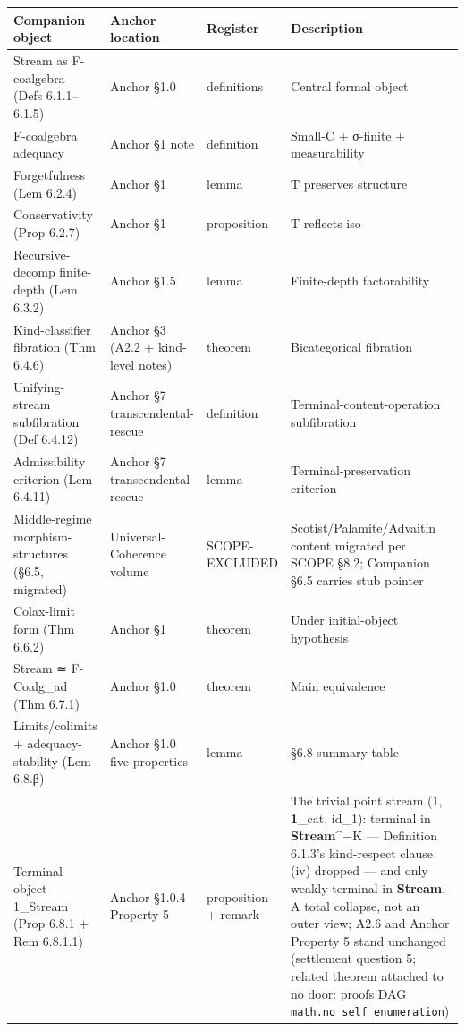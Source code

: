 \documentclass[11pt, openany]{book}
\begin{document}
\begingroup\setlength{\tabcolsep}{3pt}\renewcommand{\arraystretch}{1.15}\footnotesize
\begin{longtable}{p{0.52in} p{0.52in} p{0.52in} p{2.73in}}
\toprule
Companion object & Anchor location & Register & Description \\
\midrule
\endhead
\bottomrule
\endfoot
Stream as F-coalgebra (Defs 6.1.1–6.1.5) & Anchor §1.0 & definitions & Central formal object \\
\midrule
F-coalgebra adequacy & Anchor §1 note & definition & Small-C + σ-finite + measurability \\
\midrule
Forgetfulness (Lem 6.2.4) & Anchor §1 & lemma & T preserves structure \\
\midrule
Conservativity (Prop 6.2.7) & Anchor §1 & proposition & T reflects iso \\
\midrule
Recursive-decomp finite-depth (Lem 6.3.2) & Anchor §1.5 & lemma & Finite-depth factorability \\
\midrule
Kind-classifier fibration (Thm 6.4.6) & Anchor §3 (A2.2 + kind-level notes) & theorem & Bicategorical fibration \\
\midrule
Unifying-stream subfibration (Def 6.4.12) & Anchor §7 transcendental-rescue & definition & Terminal-content-operation subfibration \\
\midrule
Admissibility criterion (Lem 6.4.11) & Anchor §7 transcendental-rescue & lemma & Terminal-preservation criterion \\
\midrule
Middle-regime morphism-structures (§6.5, migrated) & Universal-Coherence volume & SCOPE-EXCLUDED & Scotist/\allowbreak Palamite/\allowbreak Advaitin content migrated per SCOPE §8.2; Companion §6.5 carries stub pointer \\
\midrule
Colax-limit form (Thm 6.6.2) & Anchor §1 & theorem & Under initial-object hypothesis \\
\midrule
Stream ≃ F-Coalg\_\allowbreak{}ad (Thm 6.7.1) & Anchor §1.0 & theorem & Main equivalence \\
\midrule
Limits/\allowbreak colimits + adequacy-stability (Lem 6.8.β) & Anchor §1.0 five-properties & lemma & §6.8 summary table \\
\midrule
Terminal object 1\_\allowbreak{}Stream (Prop 6.8.1 + Rem 6.8.1.1) & Anchor §1.0.4 Property 5 & proposition + remark & The trivial point stream (1, \textbf{1}\_\allowbreak{}cat, id\_\allowbreak{}1): terminal in \textbf{Stream}\textasciicircum{}{−K} --- Definition 6.1.3's kind-respect clause (iv) dropped --- and only weakly terminal in \textbf{Stream}. A total collapse, not an outer view; A2.6 and Anchor Property 5 stand unchanged (settlement question 5; related theorem attached to no door: proofs DAG \texttt{math.no\_self\_enumeration}) \\

\end{longtable}
\end{document}
